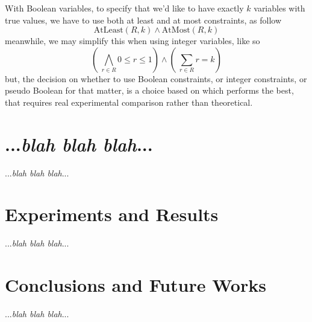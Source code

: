 \documentclass{article}
\begin{document}
With Boolean variables, to specify that we'd like to have exactly \(k\) variables with true values, we have to use both at least and at most constraints, as follow
\[
	\mathrm{AtLeast}(R, k) \wedge \mathrm{AtMost}(R, k)
\]
meanwhile, we may simplify this when using integer variables, like so
\[
	\displaystyle \left( \ \bigwedge \limits_{\displaystyle r \in R} 0 \leq r \leq 1 \right) \wedge \left( \ \sum \limits_{\displaystyle r \in R} r = k \right)
\]
but, the decision on whether to use Boolean constraints, or integer constraints, or pseudo Boolean for that matter, is a choice based on which performs the best, that requires real experimental comparison rather than theoretical.

\section{...\textit{blah blah blah}...}

...\textit{blah blah blah}...

\section{Experiments and Results}

...\textit{blah blah blah}...

\section{Conclusions and Future Works}

...\textit{blah blah blah}...
\end{document}
